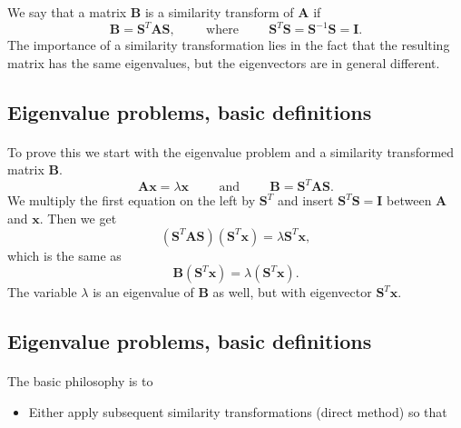 \documentclass[%
oneside,                 %
final,                   %
10pt]{article}
\begin{document}
We say that a matrix $\mathbf{B}$ is a similarity
transform  of  $\mathbf{A}$ if 
\[
     \mathbf{B}= \mathbf{S}^T \mathbf{A}\mathbf{S}, \hspace{1cm} \mathrm{where} \hspace{1cm}  \mathbf{S}^T\mathbf{S}=\mathbf{S}^{-1}\mathbf{S} =\mathbf{I}.
\]
The importance of a similarity transformation lies in the fact that
the resulting matrix has the same
eigenvalues, but the eigenvectors are in general different.



\subsection*{Eigenvalue problems, basic definitions}

\paragraph{}
To prove this we
start with  the eigenvalue problem and a similarity transformed matrix $\mathbf{B}$.
\[
   \mathbf{A}\mathbf{x}=\lambda\mathbf{x} \hspace{1cm} \mathrm{and}\hspace{1cm} 
    \mathbf{B}= \mathbf{S}^T \mathbf{A}\mathbf{S}.
\]
We multiply the first equation on the left by $\mathbf{S}^T$ and insert
$\mathbf{S}^{T}\mathbf{S} = \mathbf{I}$ between $\mathbf{A}$ and $\mathbf{x}$. Then we get
\begin{equation}
   (\mathbf{S}^T\mathbf{A}\mathbf{S})(\mathbf{S}^T\mathbf{x})=\lambda\mathbf{S}^T\mathbf{x} ,
\end{equation}  
which is the same as 
\[
   \mathbf{B} \left ( \mathbf{S}^T\mathbf{x} \right ) = \lambda \left (\mathbf{S}^T\mathbf{x}\right ).
\]
The variable  $\lambda$ is an eigenvalue of $\mathbf{B}$ as well, but with
eigenvector $\mathbf{S}^T\mathbf{x}$.



\subsection*{Eigenvalue problems, basic definitions}

\paragraph{}
The basic philosophy is to
\begin{itemize}
 \item Either apply subsequent similarity transformations (direct method) so that 
\end{itemize}
\end{document}
